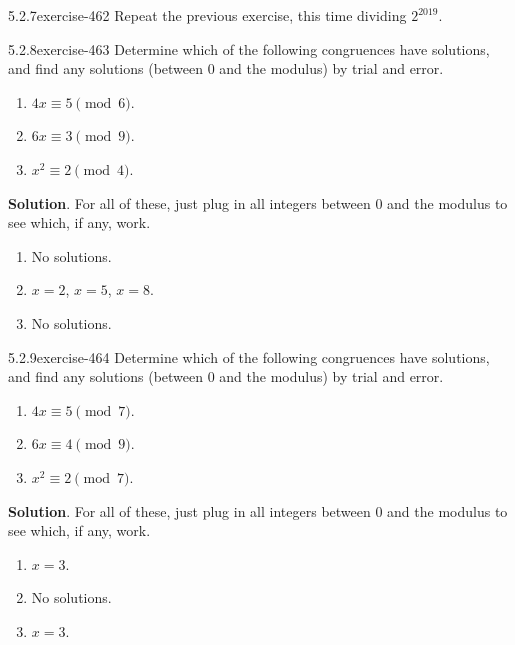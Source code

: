\documentclass[twoside,11pt,]{book}
\numberwithin{equation}{chapter}
\begin{document}
\begin{divisionsolution}{5.2.7}{}{exercise-462}%
\hypertarget{p-5285}{}%
Repeat the previous exercise, this time dividing \(2^{2019}\).%
\end{divisionsolution}%
\begin{divisionsolution}{5.2.8}{}{exercise-463}%
\hypertarget{p-5286}{}%
Determine which of the following congruences have solutions, and find any solutions (between 0 and the modulus) by trial and error.\leavevmode%
\begin{enumerate}[label=(\alph*)]
\item\hypertarget{li-2529}{}\(4x \equiv 5 \pmod 6\).%
\item\hypertarget{li-2530}{}\(6x \equiv 3 \pmod 9\).%
\item\hypertarget{li-2531}{}\(x^2 \equiv 2 \pmod 4\).%
\end{enumerate}
%
\par\smallskip%
\noindent\textbf{Solution}.\quad%
\hypertarget{p-5287}{}%
For all of these, just plug in all integers between 0 and the modulus to see which, if any, work.\leavevmode%
\begin{enumerate}[label=(\alph*)]
\item\hypertarget{li-2532}{}\hypertarget{p-5288}{}%
No solutions.%
\item\hypertarget{li-2533}{}\(x = 2\), \(x = 5\), \(x = 8\).%
\item\hypertarget{li-2534}{}\hypertarget{p-5289}{}%
No solutions.%
\end{enumerate}
%
\end{divisionsolution}%
\begin{divisionsolution}{5.2.9}{}{exercise-464}%
\hypertarget{p-5290}{}%
Determine which of the following congruences have solutions, and find any solutions (between 0 and the modulus) by trial and error.\leavevmode%
\begin{enumerate}[label=(\alph*)]
\item\hypertarget{li-2535}{}\(4x \equiv 5 \pmod 7\).%
\item\hypertarget{li-2536}{}\(6x \equiv 4 \pmod 9\).%
\item\hypertarget{li-2537}{}\(x^2 \equiv 2 \pmod 7\).%
\end{enumerate}
%
\par\smallskip%
\noindent\textbf{Solution}.\quad%
\hypertarget{p-5291}{}%
For all of these, just plug in all integers between 0 and the modulus to see which, if any, work.\leavevmode%
\begin{enumerate}[label=(\alph*)]
\item\hypertarget{li-2538}{}\(x = 3\).%
\item\hypertarget{li-2539}{}\hypertarget{p-5292}{}%
No solutions.%
\item\hypertarget{li-2540}{}\(x = 3\).%
\end{enumerate}
%
\end{divisionsolution}%
\end{document}
